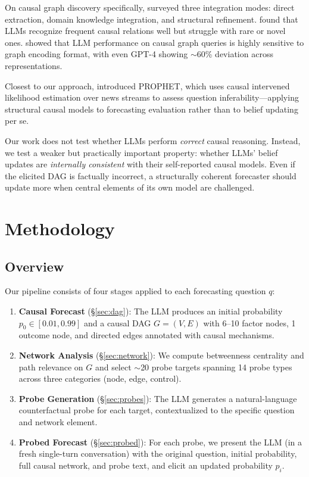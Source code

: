 \documentclass[11pt]{article}
\begin{document}
On causal graph discovery specifically, \citet{wan2024causal} surveyed three integration modes: direct extraction, domain knowledge integration, and structural refinement. \citet{feng2025reliability} found that LLMs recognize frequent causal relations well but struggle with rare or novel ones. \citet{sheth2024causalgraph2llm} showed that LLM performance on causal graph queries is highly sensitive to graph encoding format, with even GPT-4 showing $\sim$60\% deviation across representations.

Closest to our approach, \citet{tao2025prophet} introduced PROPHET, which uses causal intervened likelihood estimation over news streams to assess question inferability---applying structural causal models to forecasting evaluation rather than to belief updating per se.

Our work does not test whether LLMs perform \textit{correct} causal reasoning. Instead, we test a weaker but practically important property: whether LLMs' belief updates are \textit{internally consistent} with their self-reported causal models. Even if the elicited DAG is factually incorrect, a structurally coherent forecaster should update more when central elements of its own model are challenged.

\section{Methodology}
\label{sec:method}

\subsection{Overview}

Our pipeline consists of four stages applied to each forecasting question $q$:

\begin{enumerate}
    \item \textbf{Causal Forecast} (\S\ref{sec:dag}): The LLM produces an initial probability $p_0 \in [0.01, 0.99]$ and a causal DAG $G = (V, E)$ with 6--10 factor nodes, 1 outcome node, and directed edges annotated with causal mechanisms.
    \item \textbf{Network Analysis} (\S\ref{sec:network}): We compute betweenness centrality and path relevance on $G$ and select ${\sim}$20 probe targets spanning 14 probe types across three categories (node, edge, control).
    \item \textbf{Probe Generation} (\S\ref{sec:probes}): The LLM generates a natural-language counterfactual probe for each target, contextualized to the specific question and network element.
    \item \textbf{Probed Forecast} (\S\ref{sec:probed}): For each probe, we present the LLM (in a fresh single-turn conversation) with the original question, initial probability, full causal network, and probe text, and elicit an updated probability $p_i$.
\end{enumerate}
\end{document}
